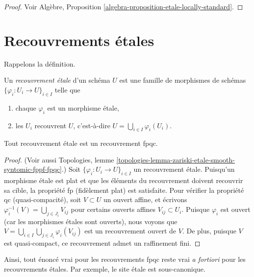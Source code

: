 \begin{proof}
Voir
Algèbre, Proposition \ref{algebra-proposition-etale-locally-standard}.
\end{proof}





\section{Recouvrements \'etales}
\label{section-etale-covering}

\noindent
Rappelons la d\'efinition.

\begin{definition}
\label{definition-etale-covering}
Un {\it recouvrement \'etale} d'un sch\'ema $U$ est une famille de morphismes
de sch\'emas
$\{\varphi_i : U_i \to U\}_{i \in I}$ telle que
\begin{enumerate}
\item chaque $\varphi_i$ est un morphisme \'etale,
\item les $U_i$ recouvrent $U$, c'est-\`a-dire $U = \bigcup_{i\in I}\varphi_i(U_i)$.
\end{enumerate}
\end{definition}

\begin{lemma}
\label{lemma-etale-fpqc}
Tout recouvrement \'etale est un recouvrement fpqc.
\end{lemma}

\begin{proof}
(Voir aussi
Topologies,
lemme \ref{topologies-lemma-zariski-etale-smooth-syntomic-fppf-fpqc}.)
Soit $\{\varphi_i : U_i \to U\}_{i \in I}$ un recouvrement \'etale.
Puisqu'un morphisme \'etale est plat et que les \'el\'ements du recouvrement doivent
recouvrir sa cible, la propri\'et\'e fp (fid\`element plat) est satisfaite.
Pour v\'erifier la propri\'et\'e qc (quasi-compacit\'e), soit $V \subset U$ un ouvert
affine, et \'ecrivons $\varphi_i^{-1}(V) = \bigcup_{j \in J_i} V_{ij}$
pour certains ouverts affines $V_{ij} \subset U_i$. Puisque $\varphi_i$ est ouvert
(car les morphismes \'etales sont ouverts), nous voyons que
$V = \bigcup_{i\in I} \bigcup_{j \in J_i} \varphi_i(V_{ij})$
est un recouvrement ouvert de $V$.
De plus, puisque $V$ est quasi-compact, ce recouvrement admet un
raffinement fini.
\end{proof}

\noindent
Ainsi, tout \'enonc\'e vrai pour les recouvrements fpqc
reste vrai {\it a fortiori} pour les recouvrements \'etales. Par
exemple, le site \'etale est sous-canonique.

